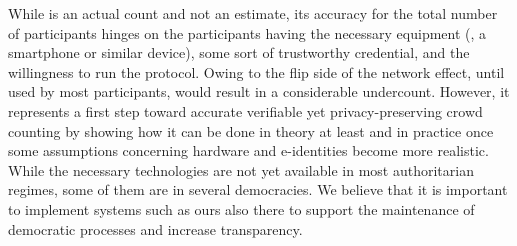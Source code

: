 
While \CROCUS is an actual count and not an estimate, its accuracy for the total number of participants hinges on the participants having the necessary equipment (\ie, a smartphone or similar device), some sort of trustworthy credential, and the willingness to run the protocol. 
Owing to the flip side of the network effect, until used by most participants, \CROCUS would result in a considerable undercount. 
However, it represents a first step toward accurate verifiable yet privacy-preserving crowd counting by showing how it can be done in theory at least and in practice once some assumptions concerning hardware and e-identities become more realistic. 
While the necessary technologies are not yet available in most authoritarian regimes, some of them are in several democracies. We believe that it is important to implement systems such as ours also there to support the maintenance of democratic processes and increase transparency.  

